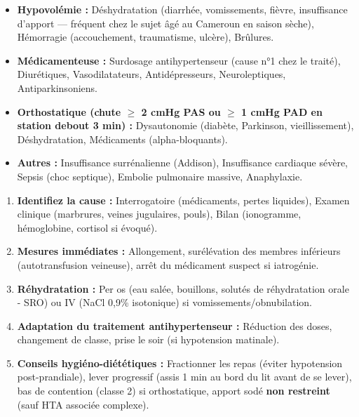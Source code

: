 \documentclass[11pt]{article}
\begin{document}
\begin{propriete}
\begin{itemize}
    \item \textbf{Hypovolémie :} Déshydratation (diarrhée, vomissements, fièvre, insuffisance d'apport — fréquent chez le sujet âgé au Cameroun en saison sèche), Hémorragie (accouchement, traumatisme, ulcère), Brûlures.
    \item \textbf{Médicamenteuse :} Surdosage antihypertenseur (cause n°1 chez le traité), Diurétiques, Vasodilatateurs, Antidépresseurs, Neuroleptiques, Antiparkinsoniens.
    \item \textbf{Orthostatique (chute $\ge$ 2 cmHg PAS ou $\ge$ 1 cmHg PAD en station debout 3 min) :} Dysautonomie (diabète, Parkinson, vieillissement), Déshydratation, Médicaments (alpha-bloquants).
    \item \textbf{Autres :} Insuffisance surrénalienne (Addison), Insuffisance cardiaque sévère, Sepsis (choc septique), Embolie pulmonaire massive, Anaphylaxie.
\end{itemize}
\end{propriete}

\begin{methode}
\begin{enumerate}
    \item \textbf{Identifiez la cause :} Interrogatoire (médicaments, pertes liquides), Examen clinique (marbrures, veines jugulaires, pouls), Bilan (ionogramme, hémoglobine, cortisol si évoqué).
    \item \textbf{Mesures immédiates :} Allongement, surélévation des membres inférieurs (autotransfusion veineuse), arrêt du médicament suspect si iatrogénie.
    \item \textbf{Réhydratation :} Per os (eau salée, bouillons, solutés de réhydratation orale - SRO) ou IV (NaCl 0,9\% isotonique) si vomissements/obnubilation.
    \item \textbf{Adaptation du traitement antihypertenseur :} Réduction des doses, changement de classe, prise le soir (si hypotension matinale).
    \item \textbf{Conseils hygiéno-diététiques :} Fractionner les repas (éviter hypotension post-prandiale), lever progressif (assis 1 min au bord du lit avant de se lever), bas de contention (classe 2) si orthostatique, apport sodé \textbf{non restreint} (sauf HTA associée complexe).
\end{enumerate}
\end{methode}
\end{document}
